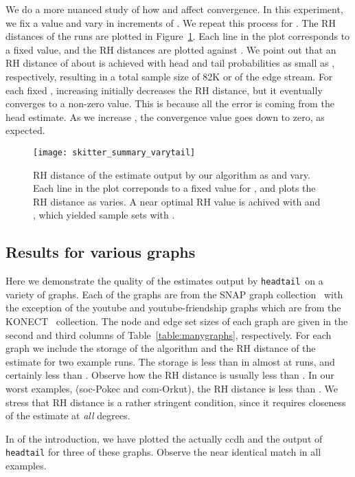 \documentclass[11pt]{article}
\theoremstyle{definition}
\newcommand{\degdist}{{\tt headtail}}
\begin{document}
We do a more nuanced study of how  and  affect convergence.
In this experiment, we fix a value  and vary  in
increments of .  We repeat this process for .  The RH distances of the runs are plotted in
Figure~\ref{fig:skitter_summary_varytail}.  Each line in the plot corresponds to
a fixed  value, and the RH distances are plotted against .  We point
out that an RH distance of about  is achieved with head and tail
probabilities as small as , respectively, resulting in a total
sample size of 82K or  of the edge stream.
For each fixed , increasing  initially decreases the RH distance, but it eventually
converges to a non-zero value. This is because all the error is coming from the head estimate.
As we increase , the convergence value goes down to zero, as expected.
\begin{figure}
\centering \texttt{[image: skitter\_summary\_varytail]}
\captionsetup{width=0.9\textwidth}
\caption{RH distance of the estimate output by our algorithm as  and 
vary.  Each line in the plot correponds to a fixed value for , and plots
the RH distance as  varies.  A near optimal RH value is achived with  and , which yielded sample sets with .}
\label{fig:skitter_summary_varytail}
\end{figure}

\subsection{Results for various graphs}
Here we demonstrate the quality of the estimates output by \degdist~on a variety
of graphs.  Each of the graphs are from the SNAP graph collection~\cite{snap}
with the exception of the youtube and youtube-friendship graphs which are from
the KONECT~\cite{konect} collection.  The node and edge set sizes of each graph
are given in the second and third columns of Table~\ref{table:manygraphs},
respectively.  For each graph we include the storage of the
algorithm and the RH distance of the estimate for two example runs.
The storage is less than  in almost at runs, and certainly less than .
Observe how the RH distance is usually less than . In our worst examples,
(soc-Pokec and com-Orkut), the RH distance is less than . We stress that RH distance
is a rather stringent condition, since it requires closeness of the estimate
at \emph{all} degrees.

In  of the introduction, we have plotted the actually ccdh and the output
of \degdist{} for three of these graphs.
Observe the near identical match in all examples.
\end{document}
